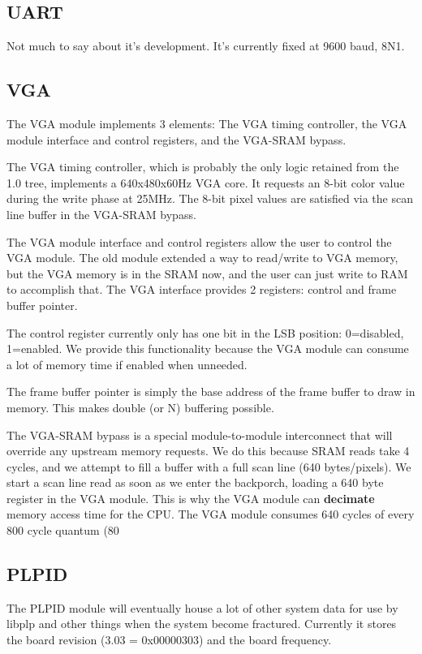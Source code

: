 \documentclass{article}
\begin{document}
\subsection{UART}
Not much to say about it's development. It's currently fixed at 9600 baud, 8N1.

\subsection{VGA}

The VGA module implements 3 elements: The VGA timing controller, the VGA module interface and control registers, and the VGA-SRAM bypass.

The VGA timing controller, which is probably the only logic retained from the 1.0 tree, implements a 640x480x60Hz VGA core. It requests an 8-bit color value during the write phase at 25MHz. The 8-bit pixel values are satisfied via the scan line buffer in the VGA-SRAM bypass.

The VGA module interface and control registers allow the user to control the VGA module. The old module extended a way to read/write to VGA memory, but the VGA memory is in the SRAM now, and the user can just write to RAM to accomplish that. The VGA interface provides 2 registers: control and frame buffer pointer.

The control register currently only has one bit in the LSB position: 0=disabled, 1=enabled. We provide this functionality because the VGA module can consume a lot of memory time if enabled when unneeded.

The frame buffer pointer is simply the base address of the frame buffer to draw in memory. This makes double (or N) buffering possible.

The VGA-SRAM bypass is a special module-to-module interconnect that will override any upstream memory requests. We do this because SRAM reads take 4 cycles, and we attempt to fill a buffer with a full scan line (640 bytes/pixels). We start a scan line read as soon as we enter the backporch, loading a 640 byte register in the VGA module. This is why the VGA module can \textbf{decimate} memory access time for the CPU. The VGA module consumes 640 cycles of every 800 cycle quantum (80%

\subsection{PLPID}

The PLPID module will eventually house a lot of other system data for use by libplp and other things when the system become fractured. Currently it stores the board revision (3.03 = 0x00000303) and the board frequency.
\end{document}
